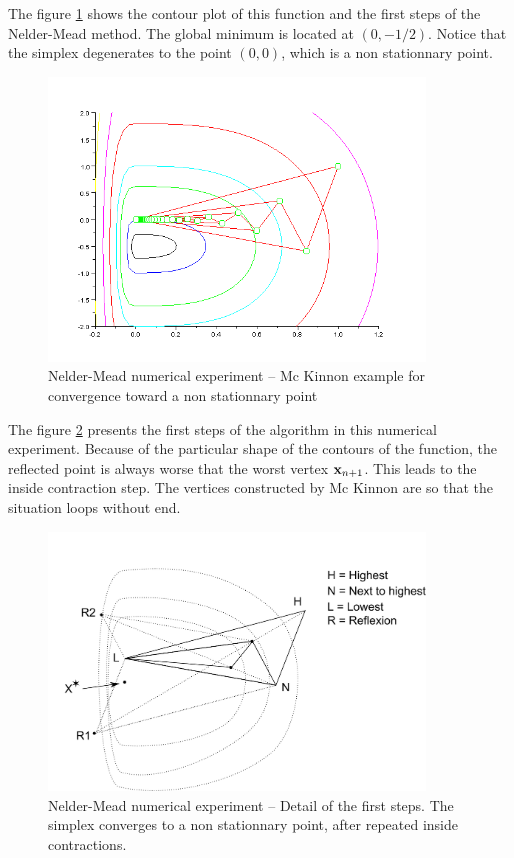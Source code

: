 The figure \ref{fig-nm-numexp-mckinnon} shows the contour plot of this function and the first 
steps of the Nelder-Mead method.
The global minimum is located at $(0,-1/2)$.
Notice that the simplex degenerates to the
point $(0,0)$, which is a non stationnary point.

\begin{figure}
\begin{center}
\includegraphics[width=10cm]{neldermeadmethod/mckinnon-history-simplex.png}
\end{center}
\caption{Nelder-Mead numerical experiment -- Mc Kinnon example for convergence toward
a non stationnary point}
\label{fig-nm-numexp-mckinnon}
\end{figure}

The figure \ref{fig-nm-numexp-mckinnon-detail} presents the first steps 
of the algorithm in this numerical experiment. Because of the 
particular shape of the contours of the function, the reflected 
point is always worse that the worst vertex $\mathbf{x}_{n+1}$. This 
leads to the inside contraction step. The vertices constructed 
by Mc Kinnon are so that the situation loops without end.

\begin{figure}
\begin{center}
\includegraphics[width=10cm]{neldermeadmethod/mcKinnon-insidecontraction.pdf}
\end{center}
\caption{Nelder-Mead numerical experiment -- Detail of the first steps.
The simplex converges to a non stationnary point, after repeated 
inside contractions.}
\label{fig-nm-numexp-mckinnon-detail}
\end{figure}

